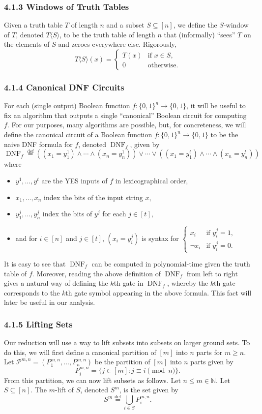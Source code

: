 \documentclass[10pt,a4paper]{article}
\begin{document}
\subsubsection*{4.1.3 Windows of Truth Tables}
Given a truth table $T$ of length $n$ and a subset $S\subseteq[n]$, we define the $S$-window of $T$, denoted $T\langle S\rangle$, to be the truth table of length $n$ that (informally) ``sees'' $T$ on the elements of $S$ and zeroes everywhere else. Rigorously,
\[T\langle S\rangle(x)=\begin{cases}T(x)&\text{if }x\in S,\\0&\text{otherwise}.\end{cases}\]
\subsubsection*{4.1.4 Canonical DNF Circuits}
For each (single output) Boolean function $f:\{0,1\}^n\to\{0,1\}$, it will be useful to fix an algorithm that outputs a single ``canonical'' Boolean circuit for computing $f$.
For our purposes, many algorithms are possible, but, for concreteness, we will define the canonical circuit of a Boolean function $f:\{0,1\}^n\to\{0,1\}$ to be the naive DNF formula for $f$, denoted $\operatorname{DNF}_f$, given by
\[\operatorname{DNF}_f\stackrel{\mathrm{def}}=((x_1=y_1^1)\land\cdots\land(x_n=y_n^1))\lor\cdots\lor((x_1=y_1^t)\land\cdots\land(x_n=y_n^t))\]
where
\begin{itemize}
\item $y^1,\ldots,y^t$ are the YES inputs of $f$ in lexicographical order,
\item $x_1,\ldots,x_n$ index the bits of the input string $x$,
\item $y_1^j,\ldots,y_n^j$ index the bits of $y^j$ for each $j\in[t]$,
\item and for $i\in[n]$ and $j\in[t]$, $(x_i=y_i^j)$ is syntax for $\begin{cases}x_i&\text{if }y_i^j=1,\\\neg x_i&\text{if }y_i^j=0.\end{cases}$
\end{itemize}
It is easy to see that $\operatorname{DNF}_f$ can be computed in polynomial-time given the truth table of $f$.
Moreover, reading the above definition of $\operatorname{DNF}_f$ from left to right gives a natural way of defining the $k$th gate in $\operatorname{DNF}_f$, whereby the $k$th gate corresponds to the $k$th gate symbol appearing in the above formula. This fact will later be useful in our analysis.
\subsubsection*{4.1.5 Lifting Sets}
Our reduction will use a way to lift subsets into subsets on larger ground sets. To do this, we will first define a canonical partition of $[m]$ into $n$ parts for $m\geq n$. Let $\mathcal P^{m,n}=(P_1^{m,n},\ldots,P_n^{m,n})$ be the partition of $[m]$ into $n$ parts given by
\[P_i^{m,n}=\{j\in[m]:j\equiv i\pmod n\}.\]
From this partition, we can now lift subsets as follows. Let $n\leq m\in\mathbb N$. Let $S\subseteq[n]$. The $m$-lift of $S$, denoted $S^m$, is the set given by
\[S^m\stackrel{\mathrm{def}}=\bigcup_{i\in S}P_i^{m,n}.\]
\end{document}
